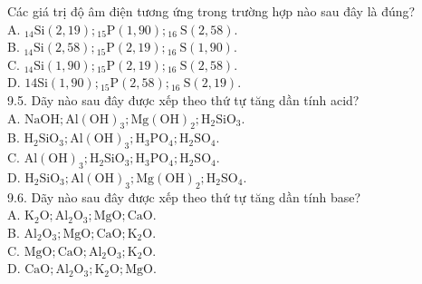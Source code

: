 \documentclass[10pt]{article}
\begin{document}
Các giá trị độ âm điện tương ứng trong trường hợp nào sau đây là đúng?\\
A. ${ }_{14} \mathrm{Si}(2,19) ;{ }_{15} \mathrm{P}(1,90) ;{ }_{16} \mathrm{~S}(2,58)$.\\
B. ${ }_{14} \mathrm{Si}(2,58) ;{ }_{15} \mathrm{P}(2,19) ;{ }_{16} \mathrm{~S}(1,90)$.\\
C. ${ }_{14} \mathrm{Si}(1,90) ;{ }_{15} \mathrm{P}(2,19) ;{ }_{16} \mathrm{~S}(2,58)$.\\
D. $14 \mathrm{Si}(1,90) ;{ }_{15} \mathrm{P}(2,58) ;{ }_{16} \mathrm{~S}(2,19)$.\\
9.5. Dãy nào sau đây được xếp theo thứ tự tăng dần tính acid?\\
A. $\mathrm{NaOH} ; \mathrm{Al}(\mathrm{OH})_{3} ; \mathrm{Mg}(\mathrm{OH})_{2} ; \mathrm{H}_{2} \mathrm{SiO}_{3}$.\\
B. $\mathrm{H}_{2} \mathrm{SiO}_{3} ; \mathrm{Al}(\mathrm{OH})_{3} ; \mathrm{H}_{3} \mathrm{PO}_{4} ; \mathrm{H}_{2} \mathrm{SO}_{4}$.\\
C. $\mathrm{Al}(\mathrm{OH})_{3} ; \mathrm{H}_{2} \mathrm{SiO}_{3} ; \mathrm{H}_{3} \mathrm{PO}_{4} ; \mathrm{H}_{2} \mathrm{SO}_{4}$.\\
D. $\mathrm{H}_{2} \mathrm{SiO}_{3} ; \mathrm{Al}(\mathrm{OH})_{3} ; \mathrm{Mg}(\mathrm{OH})_{2} ; \mathrm{H}_{2} \mathrm{SO}_{4}$.\\
9.6. Dãy nào sau đây được xếp theo thứ tự tăng dần tính base?\\
A. $\mathrm{K}_{2} \mathrm{O} ; \mathrm{Al}_{2} \mathrm{O}_{3} ; \mathrm{MgO} ; \mathrm{CaO}$.\\
B. $\mathrm{Al}_{2} \mathrm{O}_{3} ; \mathrm{MgO} ; \mathrm{CaO} ; \mathrm{K}_{2} \mathrm{O}$.\\
C. $\mathrm{MgO} ; \mathrm{CaO} ; \mathrm{Al}_{2} \mathrm{O}_{3} ; \mathrm{K}_{2} \mathrm{O}$.\\
D. $\mathrm{CaO} ; \mathrm{Al}_{2} \mathrm{O}_{3} ; \mathrm{K}_{2} \mathrm{O} ; \mathrm{MgO}$.
\end{document}
